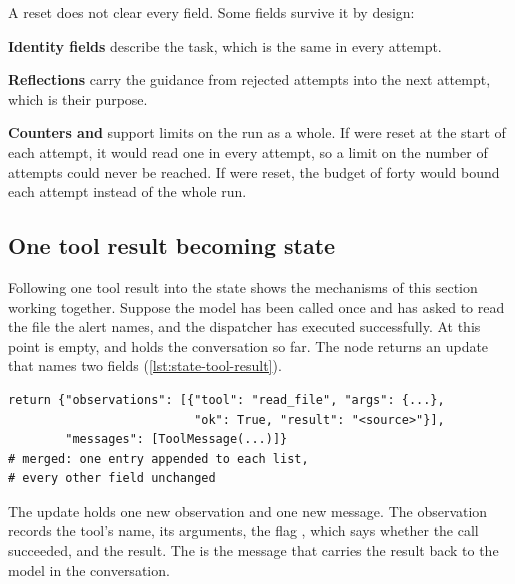A reset does not clear every field. Some fields survive it by design:
\bi
\item \textbf{Identity fields} describe the task, which is the same in every attempt.
\item \textbf{Reflections} carry the guidance from rejected attempts into the next attempt, which is
their purpose.
\item \textbf{Counters and } support limits on the run as a whole. If
 were reset at the start of each attempt, it would read one in every attempt, so a
limit on the number of attempts could never be reached. If  were reset, the
budget of forty would bound each attempt instead of the whole run.
\ei

\subsection{One tool result becoming state}
\label{sec:state-tool-result}

Following one tool result into the state shows the mechanisms of this section working together.
Suppose the model has been called once and has asked to read the file the alert names, and the
dispatcher has executed  successfully. At this point  is
empty, and  holds the conversation so far. The  node returns an
update that names two fields (\cref{lst:state-tool-result}).

\begin{lstlisting}[basicstyle=\ttfamily\footnotesize, columns=fixed, basewidth=0.525em, keepspaces=true, breaklines=false, xleftmargin=2pt, xrightmargin=2pt, caption={Illustrative code: the partial update the tools node returns after a successful read.}, label=lst:state-tool-result]
return {"observations": [{"tool": "read_file", "args": {...},
                          "ok": True, "result": "<source>"}],
        "messages": [ToolMessage(...)]}
# merged: one entry appended to each list,
# every other field unchanged
\end{lstlisting}

The update holds one new observation and one new message. The observation records the tool's name,
its arguments, the flag , which says whether the call succeeded, and the result. The
 is the message that carries the result back to the model in the conversation.


